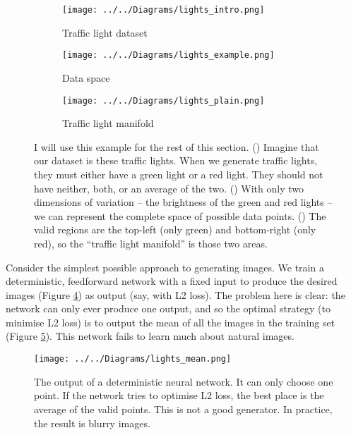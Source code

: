 \documentclass[11pt, a4paper]{book}
\newcommand{\nquote}[1]{``{#1}''}
\begin{document}
\begin{figure}
  \centering
  
      \begin{subfigure}{0.7\columnwidth}
        \centering
        \caption{Traffic light dataset}
        \texttt{[image: ../../Diagrams/lights\_intro.png]} 
        \label{trafficlights:example}
    \end{subfigure}
    \vspace{1cm}
    
    \begin{subfigure}{0.45\columnwidth}
        \centering
        \caption{Data space}
        \texttt{[image: ../../Diagrams/lights\_example.png]} 
        \label{trafficlights:axes}
    \end{subfigure}
    \hfill
    \begin{subfigure}{0.45\columnwidth}
        \centering
        \caption{Traffic light manifold}
        \texttt{[image: ../../Diagrams/lights\_plain.png]} 
        \label{trafficlights:manifold}
    \end{subfigure}
  \caption[Traffic light example]{I will use this example for the rest of this section. () Imagine that our dataset is these traffic lights. When we generate traffic lights, they must either have a green light or a red light. They should not have neither, both, or an average of the two. () With only two dimensions of variation -- the brightness of the green and red lights -- we can represent the complete space of possible data points. () The valid regions are the top-left (only green) and bottom-right (only red), so the \nquote{traffic light manifold} is those two areas.}
  \label{trafficlights}
\end{figure}

Consider the simplest possible approach to generating images. We train a deterministic, feedforward network with a fixed input to produce the desired images (Figure \ref{trafficlights}) as output (say, with L2 loss). The problem here is clear: the network can only ever produce one output, and so the optimal strategy (to minimise L2 loss) is to output the mean of all the images in the training set (Figure \ref{lightsmean}). This network fails to learn much about natural images.

\begin{figure}
  \centering
  \texttt{[image: ../../Diagrams/lights\_mean.png]}
  \caption[Output of a deterministic neural network]{The output of a deterministic neural network. It can only choose one point. If the network tries to optimise L2 loss, the best place is the average of the valid points. This is not a good generator. In practice, the result is blurry images.}
  \label{lightsmean}
\end{figure}
\end{document}
